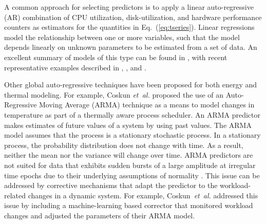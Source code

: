\documentclass[times,10pt,finalversion]{usetex-v1}
\begin{document}
A common approach for selecting predictors is to apply a linear
auto-regressive (AR) combination of CPU utilization, disk-utilization,
and hardware performance counters as estimators for the quantities in
Eq.~(\ref{eq:tseries}).  Linear regressions model the relationship
between one or more variables, such that the model depends linearly on
unknown parameters to be estimated from a set of data.  An excellent
summary of models of this type can be found in 
\cite{Rivoire2008}, with recent representative examples described in \cite{Lewis2008}, 
\cite{Bhattacharjee2009}, and \cite{Reich2010}.

Other global auto-regressive techniques have been proposed for both
energy and thermal modeling.  For example, Coskun \textit{et~al.}
\cite{Coskun2008} proposed the use of an Auto-Regressive Moving Average
(ARMA) technique as a means to model changes in temperature as part of a
thermally aware process scheduler.  An ARMA predictor makes estimates of
future values of a system by using past values. The ARMA model
assumes that the process is a stationary stochastic process. In a
stationary process, the probability distribution does not change with
time. As a result, neither the mean nor the variance will change over
time.  ARMA predictors are not suited for data that exhibits sudden
bursts of a large amplitude at irregular time epochs due to their
underlying assumptions of normality \cite{Tong1993}. This issue can be
addressed by corrective mechanisms that adapt the predictor to the
workload-related changes in a dynamic system.  For example,
Coskun~\textit{et~al.}\cite{Coskun2008} addressed this issue by
including a machine-learning based corrector that monitored workload
changes and adjusted the parameters of their ARMA model.
\end{document}
